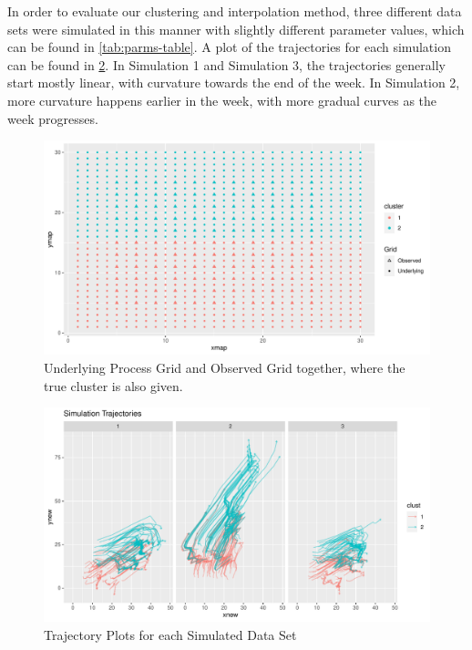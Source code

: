 \documentclass[12pt]{article}
\begin{document}
In order to evaluate our clustering and interpolation method, three
different data sets were simulated in this manner with slightly
different parameter values, which can be found in
\cref{tab:parms-table}. A plot of the trajectories for each simulation
can be found in \cref{fig:traj-wrap}. In Simulation 1 and Simulation 3,
the trajectories generally start mostly linear, with curvature towards
the end of the week. In Simulation 2, more curvature happens earlier in
the week, with more gradual curves as the week progresses.

\begin{figure}[tbp]

{\centering \includegraphics[width=\linewidth,]{spatio-temporal-model-arctic-sea-ice_files/figure-latex/grids-combined-1} 

}

\caption[Simulation Grids]{Underlying Process Grid and Observed Grid together, where the true cluster is also given.}\label{fig:grids-combined}
\end{figure}

\begin{figure}[tbp]

{\centering \includegraphics[width=\linewidth,]{spatio-temporal-model-arctic-sea-ice_files/figure-latex/traj-wrap-1} 

}

\caption{Trajectory Plots for each Simulated Data Set }\label{fig:traj-wrap}
\end{figure}
\end{document}
